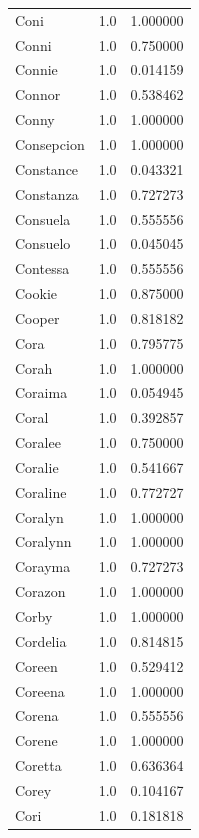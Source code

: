 \documentclass[
  letterpaper,
  DIV=11,
  numbers=noendperiod]{scrreprt}
\begin{document}
\begin{tabular}{lrr}
Coni            &   1.0 &   1.000000 \\
Conni           &   1.0 &   0.750000 \\
Connie          &   1.0 &   0.014159 \\
Connor          &   1.0 &   0.538462 \\
Conny           &   1.0 &   1.000000 \\
Consepcion      &   1.0 &   1.000000 \\
Constance       &   1.0 &   0.043321 \\
Constanza       &   1.0 &   0.727273 \\
Consuela        &   1.0 &   0.555556 \\
Consuelo        &   1.0 &   0.045045 \\
Contessa        &   1.0 &   0.555556 \\
Cookie          &   1.0 &   0.875000 \\
Cooper          &   1.0 &   0.818182 \\
Cora            &   1.0 &   0.795775 \\
Corah           &   1.0 &   1.000000 \\
Coraima         &   1.0 &   0.054945 \\
Coral           &   1.0 &   0.392857 \\
Coralee         &   1.0 &   0.750000 \\
Coralie         &   1.0 &   0.541667 \\
Coraline        &   1.0 &   0.772727 \\
Coralyn         &   1.0 &   1.000000 \\
Coralynn        &   1.0 &   1.000000 \\
Corayma         &   1.0 &   0.727273 \\
Corazon         &   1.0 &   1.000000 \\
Corby           &   1.0 &   1.000000 \\
Cordelia        &   1.0 &   0.814815 \\
Coreen          &   1.0 &   0.529412 \\
Coreena         &   1.0 &   1.000000 \\
Corena          &   1.0 &   0.555556 \\
Corene          &   1.0 &   1.000000 \\
Coretta         &   1.0 &   0.636364 \\
Corey           &   1.0 &   0.104167 \\
Cori            &   1.0 &   0.181818 \\

\end{tabular}
\end{document}

